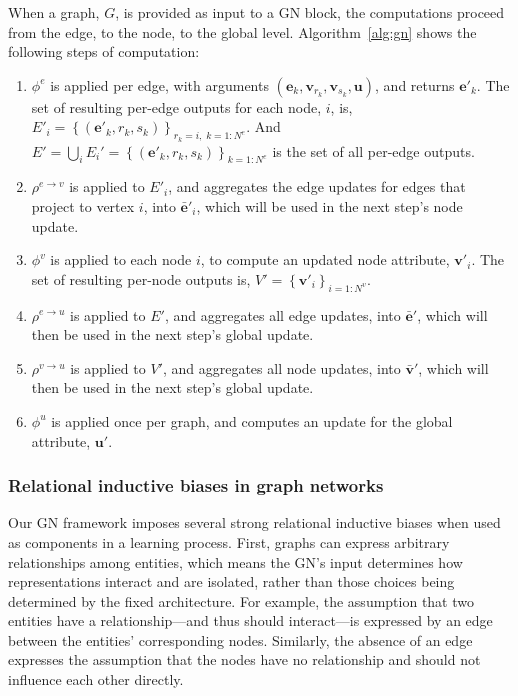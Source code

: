 \documentclass[10pt]{book}
\newcommand{\uv}{\mathbf{u}}    %
\newcommand{\ev}{\mathbf{e}}    %
\newcommand{\vv}{\mathbf{v}}    %
\begin{document}
When a graph, $G$, is provided as input to a GN block, the computations proceed from the edge, to the node, to the global level.
Algorithm~\ref{alg:gn} shows the following steps of computation:
\begin{enumerate}[noitemsep]
    \item $\phi^e$ is applied per edge, with arguments $(\ev_k, \vv_{r_k}, \vv_{s_k}, \uv)$, and returns $\ev'_k$. The set of resulting per-edge outputs for each node, $i$, is, $E'_i = \left\{\left(\mathbf{e}'_k, r_k, s_k \right)\right\}_{r_k=i,\; k=1:N^e}$. And $E' = \bigcup_i E_i' = \left\{\left(\mathbf{e}'_k, r_k, s_k \right)\right\}_{k=1:N^e}$ is the set of all per-edge outputs.
    
    \item $\rho^{e\rightarrow v}$ is applied to $E'_i$, and aggregates the edge updates for edges that project to vertex $i$, into $\mathbf{\bar{e}}'_i$, which will be used in the next step's node update.
    
    \item $\phi^v$ is applied to each node $i$, to compute an updated node attribute, $\mathbf{v}'_i$. The set of resulting per-node outputs is, $V'=\left\{\mathbf{v}'_i\right\}_{i=1:N^v}$.
    
    \item $\rho^{e\rightarrow u}$ is applied to $E'$, and aggregates all edge updates, into $\mathbf{\bar{e}}'$, which will then be used in the next step's global update.
    
    \item $\rho^{v \rightarrow u}$ is applied to $V'$, and aggregates all node updates, into $\mathbf{\bar{v}}'$, which will then be used in the next step's global update.
    
    \item $\phi^u$ is applied once per graph, and computes an update for the global attribute, $\uv'$.
\end{enumerate}

\subsubsection{Relational inductive biases in graph networks}

Our GN framework imposes several strong relational inductive biases when used as components in a learning process.
First, graphs can express arbitrary relationships among entities, which means the GN's input determines how representations interact and are isolated, rather than those choices being determined by the fixed architecture. For example, the assumption that two entities have a relationship---and thus should interact---is expressed by an edge between the entities' corresponding nodes. Similarly, the absence of an edge expresses the assumption that the nodes have no relationship and should not influence each other directly. 
\end{document}

